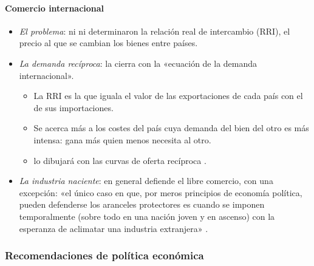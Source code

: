 \documentclass[11pt]{article}
\begin{document}
\paragraph{Comercio internacional}\label{sec:mill-comercio}
\begin{itemize}
\item \emph{El problema}: ni  ni  determinaron la relación real de intercambio (RRI), el precio al que se cambian los bienes entre países.
\item \emph{La demanda recíproca}:  la cierra con la «ecuación de la demanda internacional».
  \begin{itemize}
  \item La RRI es la que iguala el valor de las exportaciones de cada país con el de sus importaciones.
  \item Se acerca más a los costes del país cuya demanda del bien del otro es más intensa: gana más quien menos necesita al otro\nocite{Mill1844Essays}.
  \item \textcite{Marshall1879Pure} lo dibujará con las curvas de oferta recíproca .
  \end{itemize}
\item \emph{La industria naciente}: en general defiende el libre comercio, con una excepción: «el único caso en que, por meros principios de economía política, pueden defenderse los aranceles protectores es cuando se imponen temporalmente (sobre todo en una nación joven y en ascenso) con la esperanza de aclimatar una industria extranjera»\nocite{Mill1909Principles} .
\end{itemize}

\subsubsection{Recomendaciones de política económica}\label{sec:mill-politica}
\end{document}
